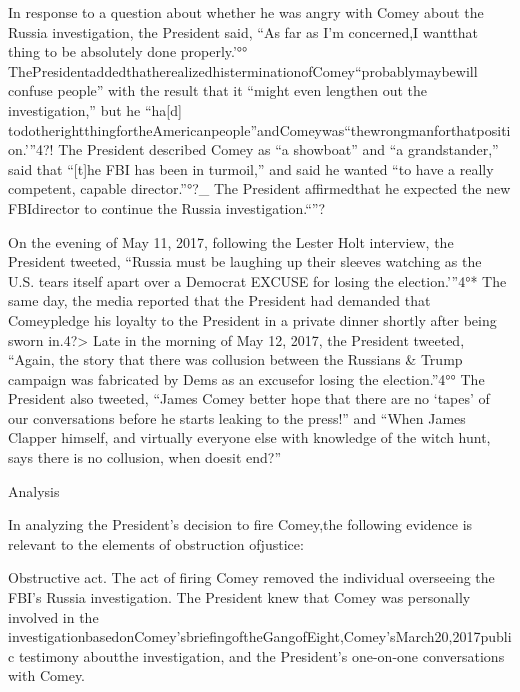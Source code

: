 {In response to a question about whether he was angry with Comey about the Russia investigation, the President said, “As far as I’m concerned,I wantthat thing to be absolutely done properly.’°° ThePresidentaddedthatherealizedhisterminationofComey“probablymaybewill confuse people” with the result that it “might even lengthen out the investigation,” but he “ha[d] todotherightthingfortheAmericanpeople”andComeywas“thewrongmanforthatposition.’”4?! The President described Comey as “a showboat” and “a grandstander,” said that “[t]he FBI has been in turmoil,” and said he wanted “to have a really competent, capable director.”°?_ The President affirmedthat he expected the new FBIdirector to continue the Russia investigation.“”?

On the evening of May 11, 2017, following the Lester Holt interview, the President tweeted, “Russia must be laughing up their sleeves watching as the U.S. tears itself apart over a Democrat EXCUSE for losing the election.’”4°* The same day, the media reported that the President had demanded that Comeypledge his loyalty to the President in a private dinner shortly after being sworn in.4?> Late in the morning of May 12, 2017, the President tweeted, “Again, the story that there was collusion between the Russians & Trump campaign was fabricated by Dems as an excusefor losing the election.”4°° The President also tweeted, “James Comey better hope that there are no ‘tapes’ of our conversations before he starts leaking to the press!” and “When James Clapper himself, and virtually everyone else with knowledge of the witch hunt, says there is no collusion, when doesit end?”

Analysis

In analyzing the President’s decision to fire Comey,the following evidence is relevant to the elements of obstruction ofjustice:

Obstructive act. The act of firing Comey removed the individual overseeing the FBI’s Russia investigation. The President knew that Comey was personally involved in the investigationbasedonComey’sbriefingoftheGangofEight,Comey’sMarch20,2017public testimony aboutthe investigation, and the President’s one-on-one conversations with Comey.

}
